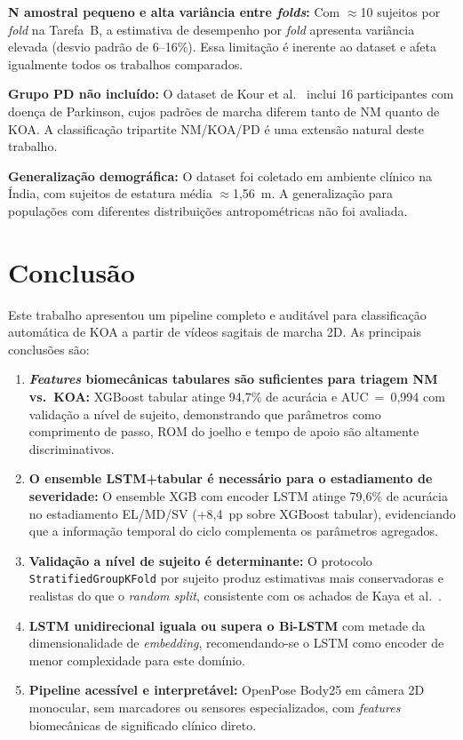 \documentclass[a4paper,12pt]{article}
\begin{document}
\textbf{N amostral pequeno e alta variância entre \textit{folds}:} Com
$\approx$10 sujeitos por \textit{fold} na Tarefa~B, a estimativa de desempenho por
\textit{fold} apresenta variância elevada (desvio padrão de 6--16\%). Essa limitação
é inerente ao dataset e afeta igualmente todos os trabalhos comparados.

\textbf{Grupo PD não incluído:} O dataset de Kour et al.~\cite{Kour2022} inclui 16
participantes com doença de Parkinson, cujos padrões de marcha diferem tanto de NM
quanto de KOA. A classificação tripartite NM/KOA/PD é uma extensão natural deste
trabalho.

\textbf{Generalização demográfica:} O dataset foi coletado em ambiente clínico na
Índia, com sujeitos de estatura média $\approx$1,56~m. A generalização para
populações com diferentes distribuições antropométricas não foi avaliada.

\section{Conclusão}

Este trabalho apresentou um pipeline completo e auditável para classificação
automática de KOA a partir de vídeos sagitais de marcha 2D. As principais conclusões
são:

\begin{enumerate}[label=\arabic*.]
  \item \textbf{\textit{Features} biomecânicas tabulares são suficientes para
        triagem NM vs.\ KOA:} XGBoost tabular atinge 94,7\% de acurácia e
        AUC~=~0,994 com validação a nível de sujeito, demonstrando que parâmetros
        como comprimento de passo, ROM do joelho e tempo de apoio são altamente
        discriminativos.

  \item \textbf{O ensemble LSTM+tabular é necessário para o estadiamento de
        severidade:} O ensemble XGB com encoder LSTM atinge 79,6\% de acurácia no
        estadiamento EL/MD/SV (+8,4~pp sobre XGBoost tabular), evidenciando que a
        informação temporal do ciclo complementa os parâmetros agregados.

  \item \textbf{Validação a nível de sujeito é determinante:} O protocolo
        \texttt{StratifiedGroupKFold} por sujeito produz estimativas mais
        conservadoras e realistas do que o \textit{random split}, consistente com
        os achados de Kaya et al.~\cite{Kaya2025}.

  \item \textbf{LSTM unidirecional iguala ou supera o Bi-LSTM} com metade da
        dimensionalidade de \textit{embedding}, recomendando-se o LSTM como encoder
        de menor complexidade para este domínio.

  \item \textbf{Pipeline acessível e interpretável:} OpenPose Body25 em câmera 2D
        monocular, sem marcadores ou sensores especializados, com \textit{features}
        biomecânicas de significado clínico direto.
\end{enumerate}
\end{document}

